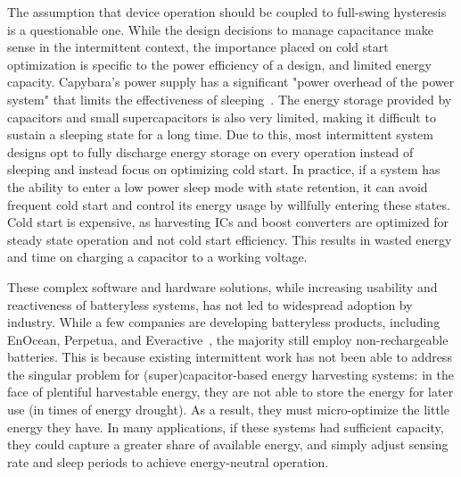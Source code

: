 The assumption that device operation should be coupled to full-swing hysteresis is a questionable one. 
While the design decisions to manage capacitance make sense in the intermittent context, the importance placed on cold start optimization is specific to the power efficiency of a design, and limited energy capacity. 
Capybara's power supply has a significant
"power overhead of the power system" that limits the effectiveness of
sleeping~\cite{colinReconfigurable18}. The energy storage provided by capacitors and small supercapacitors is also very limited, making it difficult to sustain a sleeping state for a long time. 
Due to this, most intermittent system designs opt to fully discharge energy storage on every operation instead of sleeping and instead focus on optimizing cold start.  
In practice, if a system has the ability to enter a low power sleep mode with state retention, it can avoid frequent cold start and control its energy usage by willfully entering these
states. 
Cold start is expensive, as harvesting ICs and boost converters are optimized for steady state operation and not cold start efficiency. This results in wasted energy and time on charging a capacitor to a working voltage.

These complex software and hardware solutions, while increasing usability and reactiveness of batteryless systems, has not led to widespread adoption by industry. 
While a few companies are developing batteryless products, including EnOcean, Perpetua, and Everactive~\cite{enocean, perpetua, everactive}, the majority still employ non-rechargeable batteries.
This is because existing intermittent work has not been able to address the singular problem for (super)capacitor-based energy
harvesting systems: in the face of plentiful harvestable energy, they are not
able to store the energy for later use (in times of energy drought).
As a result, they must
micro-optimize the little energy they have. 
In many applications, if these
systems had sufficient capacity, they could capture a greater share of available energy, and simply adjust sensing rate and
sleep periods to achieve energy-neutral operation. 

